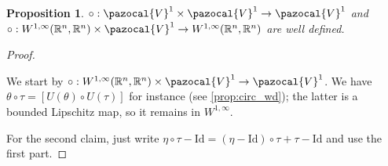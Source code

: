 \documentclass[english,a4paper,12pt,oneside]{scrbook}
\theoremstyle{break}
\newtheorem{prop}[equation]{Proposition}
\newenvironment{mproof}[1][\proofname]{%
  \begin{proof}[#1]$ $\par\nobreak\ignorespaces
}{%
  \end{proof}
}
\renewcommand*{\proofname}{Proof}
\theoremstyle{remark}
\newcommand{\mR}{\mathbb{R}}
\newcommand{\cV}{\pazocal{V}}
\newcommand{\id}{\text{Id}}
\newcommand{\te}{\theta}
\begin{document}
\begin{prop}
\label{prop:circ_wd_V}
$\circ: \cV^1 \times \cV^1 \rightarrow \cV^1$ and $\circ:W^{1,\infty}(\mR^n,\mR^n) \times \cV^1 \rightarrow W^{1,\infty}(\mR^n,\mR^n)$ are well defined.
\end{prop}
\begin{mproof}

We start by $\circ:W^{1,\infty}(\mR^n,\mR^n) \times \cV^1 \rightarrow \cV^1$. We have $\te\circ \tau =[ U(\te)\circ U(\tau)]$ for instance (see \cref{prop:circ_wd}); the latter is a bounded Lipschitz map, so it remains in $W^{1,\infty}$.

For the second claim, just write $\eta \circ \tau -\id = (\eta - \id)\circ \tau + \tau -\id$ and use the first part. 

\end{mproof}
\end{document}
